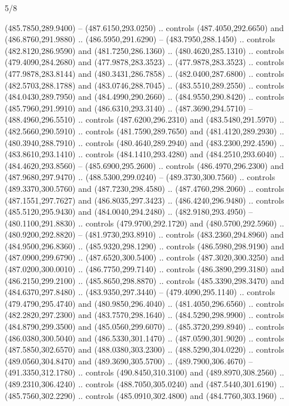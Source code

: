 \begin{flagdescription}{5/8}
\begin{scope}[xshift=0.5\flaglength,yshift=0.5\flagwidth,scale=\flagwidth/475.63]
\begin{scope}[y=0.8pt, x=0.8pt, yscale=-1, xscale=1,shift={(-450,-300)}]
\begin{scope}[cm={{1.0,0.0,0.0,1.0,(-0.0002,0.12556)}},cm={{1.0,0.0,0.0,1.0,(0.00179,0.0)}}]
  (485.7850,289.9400) -- (487.6150,293.0250) .. controls (487.4050,292.6650) and
  (486.8760,291.9880) .. (486.5950,291.6290) -- (483.7950,288.1450) .. controls
  (482.8120,286.9590) and (481.7250,286.1360) .. (480.4620,285.1310) .. controls
  (479.4090,284.2680) and (477.9878,283.3523) .. (477.9878,283.3523) .. controls
  (477.9878,283.8144) and (480.3431,286.7858) .. (482.0400,287.6800) .. controls
  (482.5703,288.1788) and (483.0746,288.7045) .. (483.5510,289.2550) .. controls
  (484.0430,289.7950) and (484.4990,290.2660) .. (484.9550,290.8420) .. controls
  (485.7960,291.9910) and (486.6310,293.3140) .. (487.3690,294.5710) --
  (488.4960,296.5510) .. controls (487.6200,296.2310) and (483.5480,291.5970) ..
  (482.5660,290.5910) .. controls (481.7590,289.7650) and (481.4120,289.2930) ..
  (480.3940,288.7910) .. controls (480.4640,289.2940) and (483.2300,292.4590) ..
  (483.8610,293.1410) .. controls (484.1410,293.4280) and (484.2510,293.6040) ..
  (484.4620,293.8560) -- (485.6900,295.2600) .. controls (486.4970,296.2300) and
  (487.9680,297.9470) .. (488.5300,299.0240) -- (489.3730,300.7560) .. controls
  (489.3370,300.5760) and (487.7230,298.4580) .. (487.4760,298.2060) .. controls
  (487.1551,297.7627) and (486.8035,297.3423) .. (486.4240,296.9480) .. controls
  (485.5120,295.9430) and (484.0040,294.2480) .. (482.9180,293.4950) --
  (480.1100,291.8830) .. controls (479.9700,292.1720) and (480.5700,292.5960) ..
  (480.9200,292.8820) -- (481.9730,293.8910) .. controls (483.2360,294.8960) and
  (484.9500,296.8360) .. (485.9320,298.1290) .. controls (486.5980,298.9190) and
  (487.0900,299.6790) .. (487.6520,300.5400) .. controls (487.3020,300.3250) and
  (487.0200,300.0010) .. (486.7750,299.7140) .. controls (486.3890,299.3180) and
  (486.2150,299.2100) .. (485.8650,298.8870) .. controls (485.3390,298.3470) and
  (484.6370,297.8480) .. (483.9350,297.3440) -- (479.4090,295.1140) .. controls
  (479.4790,295.4740) and (480.9850,296.4040) .. (481.4050,296.6560) .. controls
  (482.2820,297.2300) and (483.7570,298.1640) .. (484.5290,298.9900) .. controls
  (484.8790,299.3500) and (485.0560,299.6070) .. (485.3720,299.8940) .. controls
  (486.0380,300.5040) and (486.5330,301.1470) .. (487.0590,301.9020) .. controls
  (487.5850,302.6570) and (488.0380,303.2300) .. (488.5290,304.0220) .. controls
  (489.0560,304.8470) and (489.3690,305.5700) .. (489.7900,306.4670) --
  (491.3350,312.1780) .. controls (490.8450,310.3100) and (489.8970,308.2560) ..
  (489.2310,306.4240) .. controls (488.7050,305.0240) and (487.5440,301.6190) ..
  (485.7560,302.2290) .. controls (485.0910,302.4800) and (484.7760,303.1960) ..

\end{scope}
\end{scope}
\end{scope}
\end{flagdescription}

